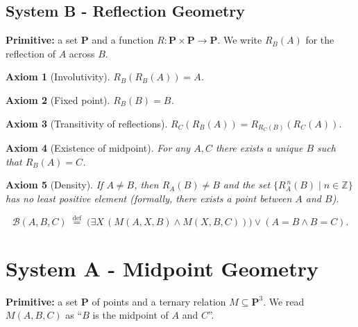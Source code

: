 \documentclass[]{article}
\newtheorem{axiom}{Axiom}
\begin{document}
\subsection*{System B - Reflection Geometry}
\textbf{Primitive:} a set \(\mathbf{P}\) and a function
\(R : \mathbf{P} \times \mathbf{P} \to \mathbf{P}\).  We write
\(R_B(A)\) for the reflection of \(A\) across \(B\).

\begin{axiom}[Involutivity]
  \(R_B(R_B(A)) = A\).
\end{axiom}
\begin{axiom}[Fixed point]
  \(R_B(B) = B\).
\end{axiom}
\begin{axiom}[Transitivity of reflections]
  \(R_C(R_B(A)) = R_{R_C(B)}(R_C(A))\).
\end{axiom}
\begin{axiom}[Existence of midpoint]
  For any \(A,C\) there exists a unique \(B\) such that \(R_B(A)=C\).
\end{axiom}
\begin{axiom}[Density]
  If \(A \neq B\), then \(R_A(B) \neq B\) and the set
  \(\{R_A^{\,n}(B) \mid n \in \mathbb{Z}\}\) has no least positive element
  (formally, there exists a point between \(A\) and \(B\)).
\end{axiom}
\[
\mathcal{B}(A,B,C) \;\overset{\text{def}}{=}\;
\bigl( \exists X\, (M(A,X,B) \land M(X,B,C)) \bigr) \lor (A=B \land B=C).
\]

\section*{System A - Midpoint Geometry}
\textbf{Primitive:} a set \(\mathbf{P}\) of points and a ternary relation
\(M \subseteq \mathbf{P}^3\).  We read \(M(A,B,C)\) as ``\(B\) is the midpoint
of \(A\) and \(C\)''.
\end{document}
